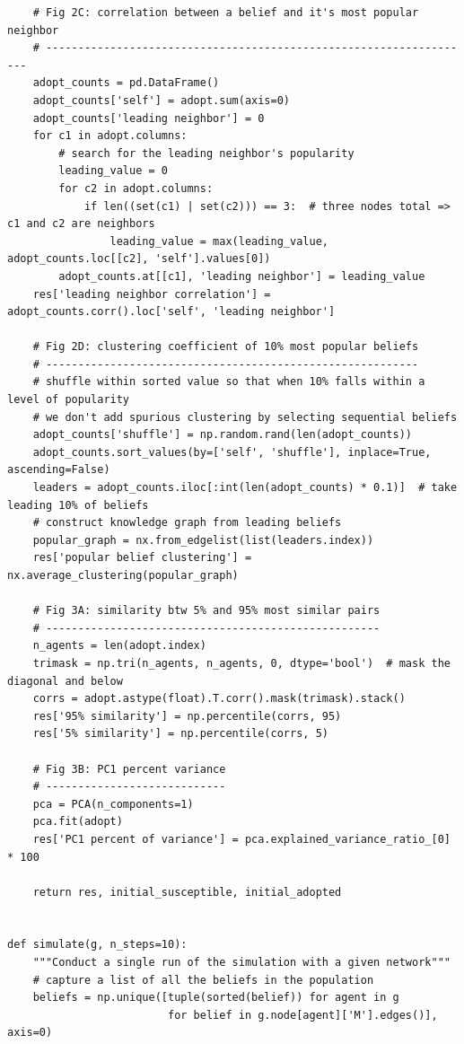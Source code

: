 \documentclass{article}
\begin{document}
\begin{verbatim}
    # Fig 2C: correlation between a belief and it's most popular neighbor
    # -------------------------------------------------------------------
    adopt_counts = pd.DataFrame()
    adopt_counts['self'] = adopt.sum(axis=0)
    adopt_counts['leading neighbor'] = 0
    for c1 in adopt.columns:
        # search for the leading neighbor's popularity
        leading_value = 0
        for c2 in adopt.columns:
            if len((set(c1) | set(c2))) == 3:  # three nodes total => c1 and c2 are neighbors
                leading_value = max(leading_value, adopt_counts.loc[[c2], 'self'].values[0])
        adopt_counts.at[[c1], 'leading neighbor'] = leading_value
    res['leading neighbor correlation'] = adopt_counts.corr().loc['self', 'leading neighbor']

    # Fig 2D: clustering coefficient of 10% most popular beliefs
    # ----------------------------------------------------------
    # shuffle within sorted value so that when 10% falls within a level of popularity
    # we don't add spurious clustering by selecting sequential beliefs
    adopt_counts['shuffle'] = np.random.rand(len(adopt_counts))
    adopt_counts.sort_values(by=['self', 'shuffle'], inplace=True, ascending=False)
    leaders = adopt_counts.iloc[:int(len(adopt_counts) * 0.1)]  # take leading 10% of beliefs
    # construct knowledge graph from leading beliefs
    popular_graph = nx.from_edgelist(list(leaders.index))  
    res['popular belief clustering'] = nx.average_clustering(popular_graph)

    # Fig 3A: similarity btw 5% and 95% most similar pairs
    # ----------------------------------------------------
    n_agents = len(adopt.index)
    trimask = np.tri(n_agents, n_agents, 0, dtype='bool')  # mask the diagonal and below
    corrs = adopt.astype(float).T.corr().mask(trimask).stack()
    res['95% similarity'] = np.percentile(corrs, 95)
    res['5% similarity'] = np.percentile(corrs, 5)

    # Fig 3B: PC1 percent variance
    # ----------------------------
    pca = PCA(n_components=1)
    pca.fit(adopt)
    res['PC1 percent of variance'] = pca.explained_variance_ratio_[0] * 100

    return res, initial_susceptible, initial_adopted


def simulate(g, n_steps=10):
    """Conduct a single run of the simulation with a given network"""
    # capture a list of all the beliefs in the population
    beliefs = np.unique([tuple(sorted(belief)) for agent in g 
                         for belief in g.node[agent]['M'].edges()], axis=0)


\end{verbatim}
\end{document}
